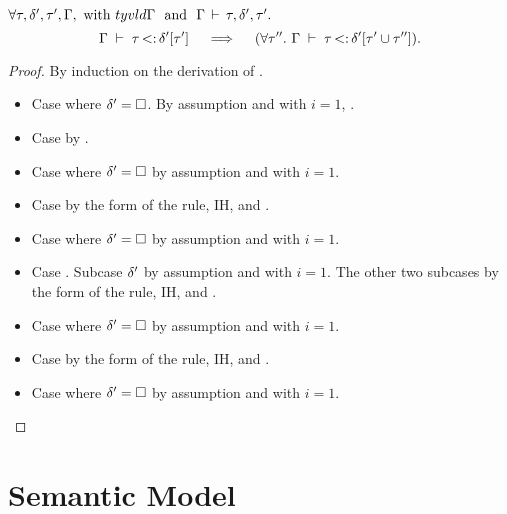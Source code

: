 \begin{lemma}%
\label{lem:add-inner-union-right:app}
    $\forall \tau, \delta', \tau', \Gamma, \text{ with }
    tyvld{}{\Gamma}\ \text{ and }\ \Gamma\,\vdash\,\tau, \delta', \tau'.$
    \[
        \subtydflt{\ty}{\plug{\dctx'}{\ty'}}
        \quad\implies\quad
        (\forall \ty''.\ \subtydflt{\ty}{\plug{\dctx'}{\tyunion{\ty'}{\ty''}}}).
    \]
\end{lemma}
\begin{proof}
    By induction on the derivation of
    .
    \begin{itemize}
        \item Case  where $\delta'=\square$. By assumption
            \subtydflt{\ty}{\tyany} and  with $i=1$,
            .
        \item Case  by .
        \item Case  where $\delta'=\square$
            by assumption and  with $i=1$.
        \item Case  by the form of the rule, IH, and .
        \item Case  where $\delta'=\square$
            by assumption and  with $i=1$.
        \item Case . 
            Subcase $\delta'$ by assumption and  with $i=1$.
            The other two subcases by the form of the rule, IH, and .
        \item Case  where $\delta'=\square$
            by assumption and  with $i=1$.
        \item Case  by the form of the rule, IH, and .
        \item Case  where $\delta'=\square$
            by assumption and  with $i=1$.
    \end{itemize}
\end{proof}

\clearpage
\section{Semantic Model}\label{sec:app:sem-sub}

